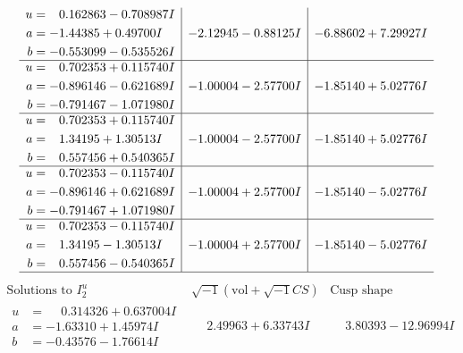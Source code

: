 \documentclass[1p]{elsarticle_modified}
\theoremstyle{definition}
\newcommand{\I}{\sqrt{-1}}
\begin{document}
$$\begin{array}{c|c|c}
\begin{aligned}
u &= \phantom{-}0.162863 - 0.708987 I \\
a &= -1.44385 + 0.49700 I \\
b &= -0.553099 - 0.535526 I\end{aligned}
 & -2.12945 - 0.88125 I & -6.88602 + 7.29927 I \\ \hline\begin{aligned}
u &= \phantom{-}0.702353 + 0.115740 I \\
a &= -0.896146 - 0.621689 I \\
b &= -0.791467 - 1.071980 I\end{aligned}
 & -1.00004 - 2.57700 I & -1.85140 + 5.02776 I \\ \hline\begin{aligned}
u &= \phantom{-}0.702353 + 0.115740 I \\
a &= \phantom{-}1.34195 + 1.30513 I \\
b &= \phantom{-}0.557456 + 0.540365 I\end{aligned}
 & -1.00004 - 2.57700 I & -1.85140 + 5.02776 I \\ \hline\begin{aligned}
u &= \phantom{-}0.702353 - 0.115740 I \\
a &= -0.896146 + 0.621689 I \\
b &= -0.791467 + 1.071980 I\end{aligned}
 & -1.00004 + 2.57700 I & -1.85140 - 5.02776 I \\ \hline\begin{aligned}
u &= \phantom{-}0.702353 - 0.115740 I \\
a &= \phantom{-}1.34195 - 1.30513 I \\
b &= \phantom{-}0.557456 - 0.540365 I\end{aligned}
 & -1.00004 + 2.57700 I & -1.85140 - 5.02776 I\\
 \hline 
 \end{array}$$\newpage$$\begin{array}{c|c|c}  
\text{Solutions to }I^u_{2}& \I (\text{vol} + \sqrt{-1}CS) & \text{Cusp shape}\\
 \hline 
\begin{aligned}
u &= \phantom{-}0.314326 + 0.637004 I \\
a &= -1.63310 + 1.45974 I \\
b &= -0.43576 - 1.76614 I\end{aligned}
 & \phantom{-}2.49963 + 6.33743 I & \phantom{-}3.80393 - 12.96994 I \\ \hline\begin{aligned}

\end{aligned}
\end{array}$$
\end{document}
